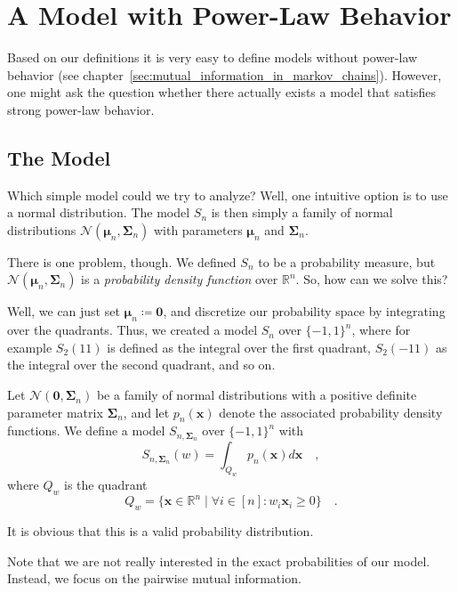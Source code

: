 \documentclass[../../main.tex]{subfiles}
\begin{document}
\section{A Model with Power-Law Behavior}
Based on our definitions it is very easy to define models without power-law behavior (see chapter~\ref{sec:mutual_information_in_markov_chains}). However, one might ask the question whether there actually exists a model that satisfies strong power-law behavior.

\subsection{The Model}
Which simple model could we try to analyze? Well, one intuitive option is to use a normal distribution. The model $S_n$ is then simply a family of normal distributions $\mathcal{N}(\bm{\mu}_n, \bm{\Sigma}_n)$ with parameters $\bm{\mu}_n$ and $\bm{\Sigma}_n$.

There is one problem, though. We defined $S_n$ to be a probability measure, but $\mathcal{N}(\bm{\mu}_n, \bm{\Sigma}_n)$ is a \emph{probability density function} over $\mathbb{R}^n$. So, how can we solve this?

Well, we can just set $\bm{\mu}_n \coloneqq \bm{0}$, and discretize our probability space by integrating over the quadrants. Thus, we created a model $S_n$ over $\{-1, 1\}^n$, where for example $S_2(11)$ is defined as the integral over the first quadrant, $S_2(-11)$ as the integral over the second quadrant, and so on.

\begin{definition}
    \label{definition:the_model}
    Let $\mathcal{N}(\bm{0}, \bm{\Sigma}_n)$ be a family of normal distributions with a positive definite parameter matrix $\bm{\Sigma}_n$, and let $p_n(\bm{x})$ denote the associated probability density functions. We define a model $S_{n, \bm{\Sigma}_n}$ over $\{-1, 1\}^n$ with
    \[
        S_{n, \bm{\Sigma}_n}(w) = \int_{Q_w} p_n(\bm{x}) d\bm{x} \quad ,
    \]
    where $Q_w$ is the quadrant
    \[
        Q_w = \{ \bm{x} \in \mathbb{R}^n \mid \forall i \in [n] : w_i \bm{x}_i \geq 0 \} \quad .
    \]
\end{definition}

\begin{remark}
    It is obvious that this is a valid probability distribution.
\end{remark}

Note that we are not really interested in the exact probabilities of our model. Instead, we focus on the pairwise mutual information.
\end{document}
